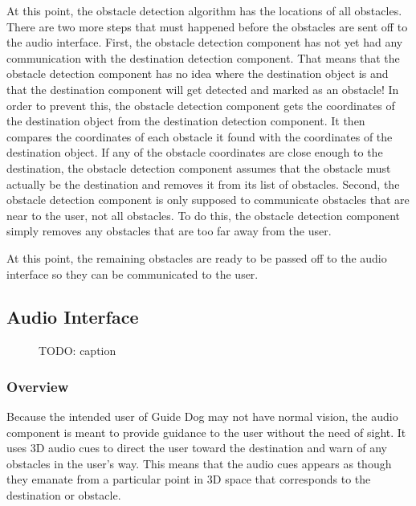 At this point, the obstacle detection algorithm has the locations of all
obstacles. There are two more steps that must happened before the obstacles are
sent off to the audio interface. First, the obstacle detection component has not
yet had any communication with the destination detection component. That means
that the obstacle detection component has no idea where the destination object is
and that the destination component will get detected and marked as an obstacle!
In order to prevent this, the obstacle detection component gets the coordinates
of the destination object from the destination detection component. It then
compares the coordinates of each obstacle it found with the coordinates of the
destination object. If any of the obstacle coordinates are close enough to the
destination, the obstacle detection component assumes that the obstacle must
actually be the destination and removes it from its list of obstacles. Second,
the obstacle detection component is only supposed to communicate obstacles that
are near to the user, not all obstacles. To do this, the obstacle detection
component simply removes any obstacles that are too far away from the user.

At this point, the remaining obstacles are ready to be passed off to the audio
interface so they can be communicated to the user.

\subsection{Audio Interface}
\label{sec:technical-audio}

\begin{figure}
\caption{TODO: caption}
\label{fig:vsim}
\end{figure}

\subsubsection{Overview}
\label{sec:technical-audio-overview}

Because the intended user of Guide Dog may not have normal vision, the audio 
component is meant to provide guidance to the user without the need of sight. It
uses 3D audio cues to direct the user toward the destination and warn of any 
obstacles in the user's way. This means that the audio cues appears as though
they emanate from a particular point in 3D space that corresponds to the
destination or obstacle.

